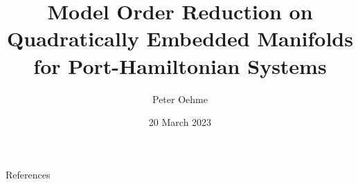 

\author{Peter Oehme}
\title[MOR on Quadratically Embedded Manifolds for pH Systems]{Model Order Reduction on Quadratically Embedded Manifolds for Port-Hamiltonian Systems}
\date{20 March 2023}


    {
        \begin{frame}
            \maketitle
        \end{frame}
    }

    \begin{frame}
        \begin{minipage}{\textwidth}
            \tableofcontents
        \end{minipage}
    \end{frame}

    \setcounter{framenumber}{0} %

    
    
    
    

    \begin{frame}[allowframebreaks]{References}
        \def\newblock{}
        \printbibliography[
            heading=none
        ]
    \end{frame}

    

